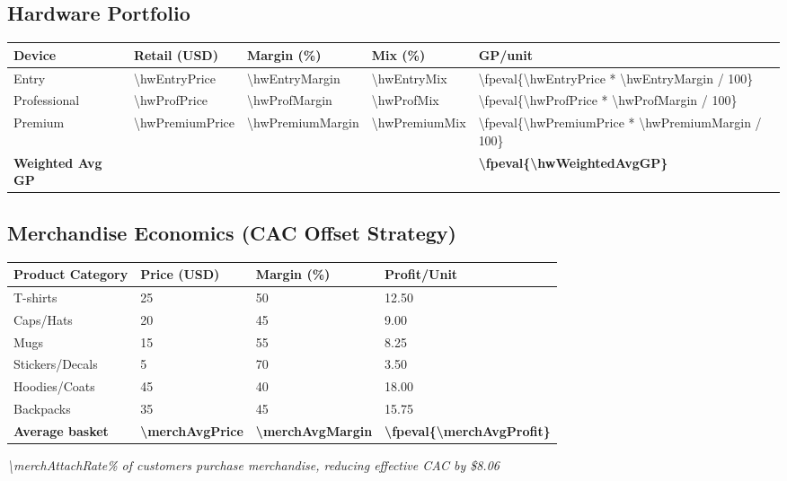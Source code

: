 \documentclass[11pt]{article}
\newcommand{\numfpeval}[1]{\num{\fpeval{#1}}}
\begin{document}
\subsection{Hardware Portfolio}
\begin{table}[H]
\centering
\begin{tabularx}{\linewidth}{l Y Y Y Y}
\toprule
Device & Retail (USD) & Margin (\%)\cite{industrybenchmark2024} & Mix (\%) & GP/unit \\\midrule
Entry        & \num{\hwEntryPrice}  & \num{\hwEntryMargin} & \num{\hwEntryMix} & \numfpeval{\hwEntryPrice * \hwEntryMargin / 100} \\
Professional & \num{\hwProfPrice} & \num{\hwProfMargin} & \num{\hwProfMix} & \numfpeval{\hwProfPrice * \hwProfMargin / 100} \\
Premium      & \num{\hwPremiumPrice} & \num{\hwPremiumMargin} & \num{\hwPremiumMix} & \numfpeval{\hwPremiumPrice * \hwPremiumMargin / 100} \\\midrule
\textbf{Weighted Avg GP} &  &  &  & \textbf{\numfpeval{\hwWeightedAvgGP}} \\
\bottomrule
\end{tabularx}
\end{table}

\subsection{Merchandise Economics (CAC Offset Strategy)}
\begin{table}[H]
\centering
\begin{tabularx}{\linewidth}{l Y Y Y}
\toprule
Product Category & Price (USD) & Margin (\%)\cite{printful2023} & Profit/Unit \\\midrule
T-shirts & \num{25} & \num{50} & \num{12.50} \\
Caps/Hats & \num{20} & \num{45} & \num{9.00} \\
Mugs & \num{15} & \num{55} & \num{8.25} \\
Stickers/Decals & \num{5} & \num{70} & \num{3.50} \\
Hoodies/Coats & \num{45} & \num{40} & \num{18.00} \\
Backpacks & \num{35} & \num{45} & \num{15.75} \\\midrule
\textbf{Average basket} & \textbf{\num{\merchAvgPrice}} & \textbf{\num{\merchAvgMargin}} & \textbf{\numfpeval{\merchAvgProfit}} \\
\bottomrule
\end{tabularx}
\end{table}
\textit{\num{\merchAttachRate}\% of customers purchase merchandise, reducing effective CAC by \$\num{8.06}}\cite{shopify2024}
\end{document}
